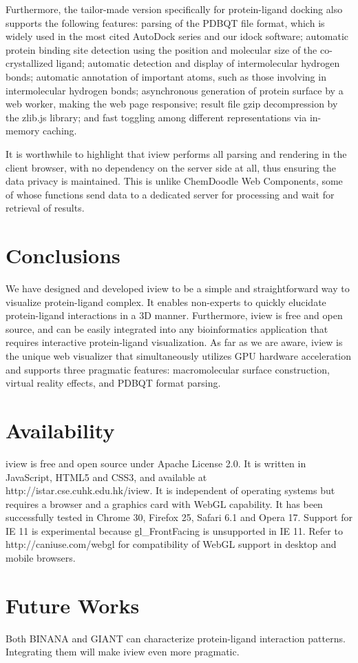 Furthermore, the tailor-made version specifically for protein-ligand docking also supports the following features: parsing of the PDBQT file format, which is widely used in the most cited AutoDock series and our idock software; automatic protein binding site detection using the position and molecular size of the co-crystallized ligand; automatic detection and display of intermolecular hydrogen bonds; automatic annotation of important atoms, such as those involving in intermolecular hydrogen bonds; asynchronous generation of protein surface by a web worker, making the web page responsive; result file gzip decompression by the zlib.js library; and fast toggling among different representations via in-memory caching.

It is worthwhile to highlight that iview performs all parsing and rendering in the client browser, with no dependency on the server side at all, thus ensuring the data privacy is maintained. This is unlike ChemDoodle Web Components, some of whose functions send data to a dedicated server for processing and wait for retrieval of results.

\section{Conclusions}

We have designed and developed iview to be a simple and straightforward way to visualize protein-ligand complex. It enables non-experts to quickly elucidate protein-ligand interactions in a 3D manner. Furthermore, iview is free and open source, and can be easily integrated into any bioinformatics application that requires interactive protein-ligand visualization. As far as we are aware, iview is the unique web visualizer that simultaneously utilizes GPU hardware acceleration and supports three pragmatic features: macromolecular surface construction, virtual reality effects, and PDBQT format parsing.

\section{Availability}

iview is free and open source under Apache License 2.0. It is written in JavaScript, HTML5 and CSS3, and available at http://istar.cse.cuhk.edu.hk/iview. It is independent of operating systems but requires a browser and a graphics card with WebGL capability. It has been successfully tested in Chrome 30, Firefox 25, Safari 6.1 and Opera 17. Support for IE 11 is experimental because gl\_FrontFacing is unsupported in IE 11. Refer to http://caniuse.com/webgl for compatibility of WebGL support in desktop and mobile browsers.

\section{Future Works}

Both BINANA \citep{1413} and GIANT \citep{1359} can characterize protein-ligand interaction patterns. Integrating them will make iview even more pragmatic.


\chapterend
